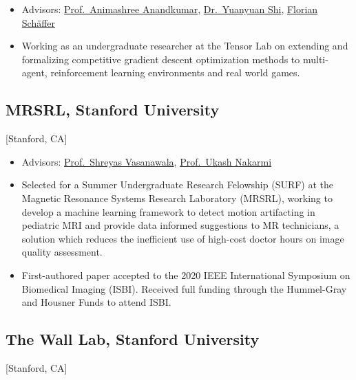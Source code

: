\documentclass{mycv}
\begin{document}
\begin{itemize}
  \item Advisors: \href{http://tensorlab.cms.caltech.edu/users/anima/}{Prof.~Animashree Anandkumar}, \href{http://shiyuanyuan.site/}{Dr.~Yuanyuan Shi}, \href{https://f-t-s.github.io/}{Florian Sch\"{a}ffer}
  \item Working as an undergraduate researcher at the Tensor Lab on extending and formalizing competitive gradient descent optimization methods to multi-agent, reinforcement learning environments and real world games.
\end{itemize}

\subsection{MRSRL, Stanford University}[Stanford, CA]
\begin{positions}
\end{positions}

\begin{itemize}
  \item Advisors: \href{https://profiles.stanford.edu/shreyas-vasanawala}{Prof.~Shreyas Vasanawala}, \href{https://computer-science-and-computer-engineering.uark.edu/directory/index/uid/unakarmi/name/Ukash+Nakarmi/}{Prof.~Ukash Nakarmi}
  \item Selected for a Summer Undergraduate Research Felowship (SURF) at the Magnetic Resonance Systems Research Laboratory (MRSRL), working to develop a machine learning framework to detect motion artifacting in pediatric MRI and provide data informed suggestions to MR technicians, a solution which reduces the inefficient use of high-cost doctor hours on image quality assessment.
  \item First-authored paper accepted to the 2020 IEEE International Symposium on Biomedical Imaging (ISBI). Received full funding through the Hummel-Gray and Housner Funds to attend ISBI.

\end{itemize}

\subsection{The Wall Lab, Stanford University}[Stanford, CA]
\begin{positions}
\end{positions}
\end{document}
